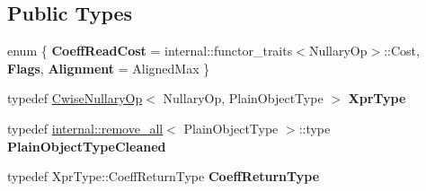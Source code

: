 \subsection*{Public Types}
\begin{DoxyCompactItemize}
\item 
\mbox{\label{struct_eigen_1_1internal_1_1evaluator_3_01_cwise_nullary_op_3_01_nullary_op_00_01_plain_object_type_01_4_01_4_a58d7b9baeedfcd2c85f5081060298460}} 
enum \{ {\bfseries Coeff\+Read\+Cost} = internal\+::functor\+\_\+traits$<$Nullary\+Op$>$\+::Cost, 
{\bfseries Flags}, 
{\bfseries Alignment} = Aligned\+Max
 \}
\item 
\mbox{\label{struct_eigen_1_1internal_1_1evaluator_3_01_cwise_nullary_op_3_01_nullary_op_00_01_plain_object_type_01_4_01_4_ab6f62cdcb15237aab3e944ef9d23f17b}} 
typedef \mbox{\hyperlink{class_eigen_1_1_cwise_nullary_op}{Cwise\+Nullary\+Op}}$<$ Nullary\+Op, Plain\+Object\+Type $>$ {\bfseries Xpr\+Type}
\item 
\mbox{\label{struct_eigen_1_1internal_1_1evaluator_3_01_cwise_nullary_op_3_01_nullary_op_00_01_plain_object_type_01_4_01_4_a07e7e4d776dbdfd49790528ca9e3f16d}} 
typedef \mbox{\hyperlink{struct_eigen_1_1internal_1_1remove__all}{internal\+::remove\+\_\+all}}$<$ Plain\+Object\+Type $>$\+::type {\bfseries Plain\+Object\+Type\+Cleaned}
\item 
\mbox{\label{struct_eigen_1_1internal_1_1evaluator_3_01_cwise_nullary_op_3_01_nullary_op_00_01_plain_object_type_01_4_01_4_a7b3bd6527e119b6b58192153c8213c34}} 
typedef Xpr\+Type\+::\+Coeff\+Return\+Type {\bfseries Coeff\+Return\+Type}
\end{DoxyCompactItemize}
